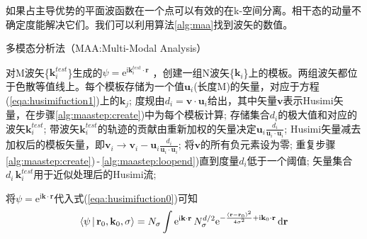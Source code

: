 \documentclass[UTF8]{ctexart}
\begin{document}
如果占主导优势的平面波函数在一个点可以有效的在k-空间分离。相干态的动量不确定度能解决它们。我们可以利用算法\ref{alg:maa}找到波矢的数值。

\begin{algorithm}[htb] 
    \caption{多模态分析法（MAA:Multi-Modal Analysis）}
    \label{alg:maa}
    \begin{algorithmic}[1]
        \STATE 对M波矢\{$\mathbf{k}^{test}_{i}$\}生成的$\psi=\mathrm{e}^{\mathrm{i}\mathbf{k}_i^{test}\cdot\mathbf{r}}$ ，创建一组N波矢\{$\mathbf{k}_i$\}上的模板。两组波矢都位于色散等值线上。每个模板存储为一个值$\mathbf{u}_i$(长度M)的矢量，对应于方程(\ref{eqa:husimifuction1})上的$\mathbf{k}_j$;
        \label{alg:maastep:create}
        \STATE 度规由$d_i=\mathbf{v}\cdot\mathbf{u}_i$给出，其中矢量$\mathbf{v}$表示Husimi矢量，在步骤\ref{alg:maastep:create})中为每个模板计算;
        \STATE 存储集合{$d_i$}的极大值和对应的波矢$\mathbf{k}^{test}_i$;
        \STATE 带波矢$\mathbf{k}^{test}_i$的轨迹的贡献由重新加权的矢量决定$\mathbf{u}_i\frac{d_i}{\mathbf{u}_i\cdot\mathbf{u}_i}$;
        \STATE Husimi矢量减去加权后的模板矢量，即$\mathbf{v}_i \rightarrow \mathbf{v}_i - \mathbf{u}_i\frac{d_i}{\mathbf{u}_i\cdot\mathbf{u}_i}$;
        \STATE 将$\mathbf{v}$的所有负元素设为零;
        \label {alg:maastep:loopend}
        \STATE 重复步骤\ref{alg:maastep:create})\,-\,\ref{alg:maastep:loopend})直到度量$d_i$低于一个阈值;
        \STATE 矢量集合{$d_i\,\mathbf{k}^{test}_i$}用于近似处理后的Husimi流;
    \end{algorithmic}
\end{algorithm}

将$\psi=\mathrm{e}^{\mathrm{i}\mathbf{k}\cdot\mathbf{r}}$代入式(\ref{eqa:husimifuction0})可知
\begin{equation}
    \begin{aligned}
        \Braket{\mathbf{\psi}|\mathbf{r}_0,\mathbf{k}_0,\sigma} = N_\sigma\int \mathrm{e}^{\mathrm{i}\mathbf{k}\cdot\mathbf{r}}\,N_{\sigma}^{d/2}\mathrm{e}^{-\frac{(\mathbf{r}-\mathbf{r}_0)^2}{4\sigma^2}+\mathrm{i}\mathbf{k}_0\cdot\mathbf{r}}\,\mathrm{d}\mathbf{r}       
    \end{aligned}
\end{equation}




%
% 
\end{document}
